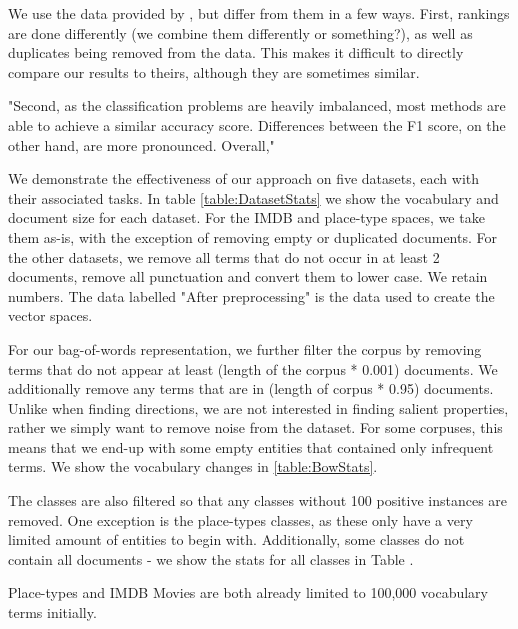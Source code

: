 We use the data provided by \cite{Derrac2015}, but differ from them in a few ways. First, rankings are done differently (we combine them differently or something?), as well as duplicates being removed from the data. This makes it difficult to directly compare our results to theirs, although they are sometimes similar.

"Second, as the classification problems are heavily imbalanced, most methods are able to achieve a similar accuracy score. Differences between the F1 score, on the other hand, are more pronounced. Overall," \cite{Derrac2015}

We demonstrate the effectiveness of our approach on five datasets, each with their associated tasks. In table \ref{table:DatasetStats} we show the vocabulary and document size for each dataset. For the IMDB and place-type spaces, we take them as-is, with the exception of removing empty or duplicated documents. For the other datasets, we remove all terms that do not occur in at least 2 documents, remove all punctuation and convert them to lower case. We retain numbers. The data labelled "After preprocessing" is the data used to create the vector spaces. 

For our bag-of-words representation, we further filter the corpus by removing terms that do not appear at least (length of the corpus * 0.001) documents. We additionally remove any terms that are in (length of corpus * 0.95) documents. Unlike when finding directions, we are not interested in finding salient properties, rather we simply want to remove noise from the dataset. For some corpuses, this means that we end-up with some empty entities that contained only infrequent terms. We show the vocabulary changes in \ref{table:BowStats}.

The classes are also filtered so that any classes without 100 positive instances are removed. One exception is the place-types classes, as these only have a very limited amount of entities to begin with. Additionally, some classes do not contain all documents - we show the stats for all classes in Table \label{table:ClassStats}.

Place-types and IMDB Movies are both already limited to 100,000 vocabulary terms initially.

